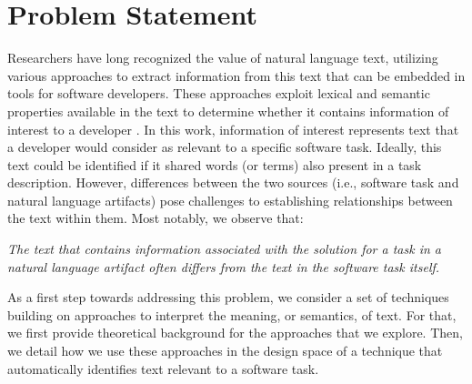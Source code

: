 \clearpage

\section{Problem Statement}
\label{cp5:motivation}





Researchers have long recognized the value of natural language
text, utilizing various approaches to extract
information from this text that can be embedded in
tools for software developers.
These approaches exploit lexical and semantic properties available in the text to determine 
whether it contains information of interest to a developer . 
In this work, information of interest represents text that a developer would consider as relevant to a specific software task. Ideally, this text could be identified if it shared  
words (or terms) also present in a task description. However, differences between the two sources (i.e., software task and natural language artifacts) pose challenges to establishing relationships between the text within them. Most notably, we observe that:



\medskip
\begin{bluequote}
    \textit{The text  that contains information associated with the solution for a task in a natural language artifact often differs from the text in the software task itself.}
\end{bluequote}





As a first step towards addressing this problem, we consider a set of techniques
 building on approaches to interpret the meaning, or semantics, of text.
 For that, we first provide theoretical background for the approaches that we explore. Then, we detail how we use these approaches in the design space of a technique that automatically identifies text relevant to a software task.












